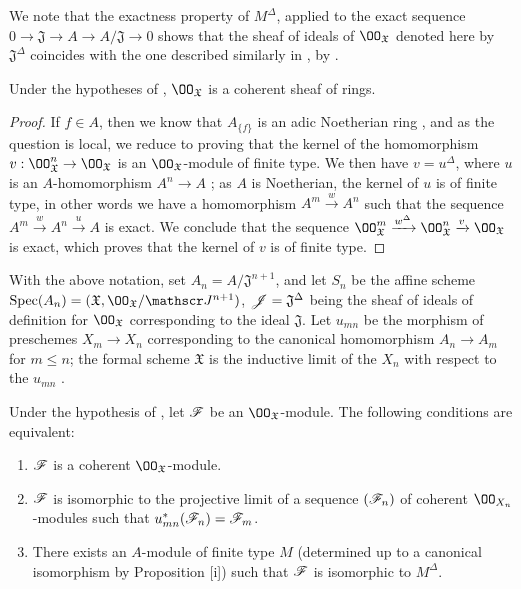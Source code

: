We note that the exactness property of $M^\Delta$, applied to the exact sequence $0\to\mathfrak{J}\to A\to A/\mathfrak{J}\to 0$ shows that the sheaf of ideals of $\OO_\mathfrak{X}$ denoted here by $\mathfrak{J}^\Delta$ coincides with the one described similarly in , by .

\begin{prop}[10.10.3]
\label{1.10.10.3}
Under the hypotheses of , $\OO_\mathfrak{X}$ is a coherent sheaf of rings.
\end{prop}

\begin{proof}
\label{proof-1.10.10.3}
If $f\in A$, then we know that $A_{\{f\}}$ is an adic Noetherian ring , and as the question is local, we reduce  to proving that the kernel of the homomorphism $v:\OO_\mathfrak{X}^n\to\OO_\mathfrak{X}$ is an $\OO_\mathfrak{X}$-module of finite type.
We then have $v=u^\Delta$, where $u$ is an $A$-homomorphism $A^n\to A$ ; as $A$ is Noetherian, the kernel of $u$ is of finite type, in other words we have a homomorphism $A^m\xrightarrow{w}A^n$ such that the sequence $A^m\xrightarrow{w}A^n\xrightarrow{u}A$ is exact.
We conclude  that the sequence $\OO_\mathfrak{X}^m\xrightarrow{w^\Delta}\OO_\mathfrak{X}^n\xrightarrow{v}\OO_\mathfrak{X}$ is exact, which proves that the kernel of $v$ is of finite type.
\end{proof}

\begin{env}[10.10.4]
\label{1.10.10.4}
With the above notation, set $A_n=A/\mathfrak{J}^{n+1}$, and let $S_n$ be the affine scheme $\Spec(A_n)=(\mathfrak{X},\OO_\mathfrak{X}/\sh{J}^{n+1})$, $\mathscr{J}=\mathfrak{J}^\Delta$ being the sheaf of ideals of definition for $\OO_\mathfrak{X}$ corresponding to the ideal $\mathfrak{J}$.
Let $u_{mn}$ be the morphism of preschemes $X_m\to X_n$ corresponding to the canonical homomorphism $A_n\to A_m$ for $m\leq n$; the formal scheme $\mathfrak{X}$ is the inductive limit of the $X_n$ with respect to the $u_{mn}$ .
\end{env}

\begin{prop}[10.10.5]
\label{1.10.10.5}
Under the hypothesis of , let $\mathscr{F}$ be an $\OO_\mathfrak{X}$-module.
The following conditions are equivalent:
\begin{enumerate}[label=\emph{(\alph*)}]
  \item $\mathscr{F}$ is a coherent $\OO_\mathfrak{X}$-module.
  \item $\mathscr{F}$ is isomorphic to the projective limit  of a sequence $(\mathscr{F}_n)$ of coherent $\OO_{X_n}$-modules such that $u_{mn}^*(\mathscr{F}_n)=\mathscr{F}_m$.
  \item There exists an $A$-module of finite type $M$ (determined up to a canonical isomorphism by Proposition [i]) such that $\mathscr{F}$ is isomorphic to $M^\Delta$.
\end{enumerate}
\end{prop}


